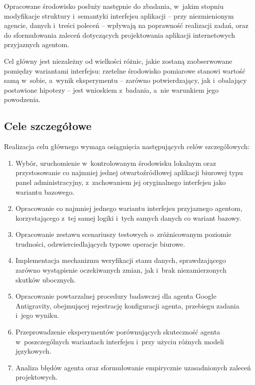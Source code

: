 Opracowane środowisko posłuży następnie do zbadania, w~jakim stopniu modyfikacje struktury i~semantyki interfejsu aplikacji -- przy niezmienionym agencie, danych i~treści poleceń -- wpływają na poprawność realizacji zadań, oraz do sformułowania zaleceń dotyczących projektowania aplikacji internetowych przyjaznych agentom.

Cel główny jest niezależny od wielkości różnic, jakie zostaną zaobserwowane pomiędzy wariantami interfejsu: rzetelne środowisko pomiarowe stanowi wartość samą w~sobie, a~wynik eksperymentu -- zarówno potwierdzający, jak i~obalający postawione hipotezy -- jest wnioskiem z~badania, a~nie warunkiem jego powodzenia.

\subsection*{Cele szczegółowe}
Realizacja celu głównego wymaga osiągnięcia następujących celów szczegółowych:
\begin{enumerate}[label=C\arabic*.]
    \item Wybór, uruchomienie w~kontrolowanym środowisku lokalnym oraz przystosowanie co najmniej jednej otwartoźródłowej aplikacji biurowej typu panel administracyjny, z~zachowaniem jej oryginalnego interfejsu jako wariantu bazowego.
    \item Opracowanie co najmniej jednego wariantu interfejsu przyjaznego agentom, korzystającego z~tej samej logiki i~tych samych danych co wariant bazowy.
    \item Opracowanie zestawu scenariuszy testowych o~zróżnicowanym poziomie trudności, odzwierciedlających typowe operacje biurowe.
    \item Implementacja mechanizmu weryfikacji stanu danych, sprawdzającego zarówno wystąpienie oczekiwanych zmian, jak i~brak niezamierzonych skutków ubocznych.
    \item Opracowanie powtarzalnej procedury badawczej dla agenta Google Antigravity, obejmującej rejestrację konfiguracji agenta, przebiegu zadania i~jego wyniku.
    \item Przeprowadzenie eksperymentów porównujących skuteczność agenta w~poszczególnych wariantach interfejsu i~przy użyciu różnych modeli językowych.
    \item Analiza błędów agenta oraz sformułowanie empirycznie uzasadnionych zaleceń projektowych.
\end{enumerate}


